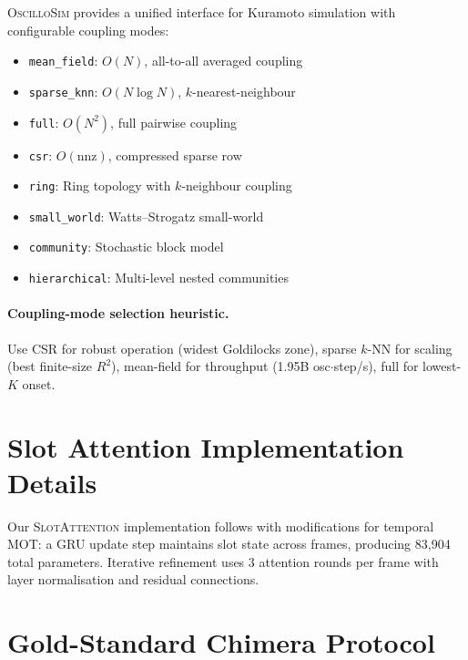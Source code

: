 \documentclass[11pt]{article}
\providecommand{\oscillosim}{\textnormal{\textsc{OscilloSim}}\xspace}
\providecommand{\sa}{\textnormal{\textsc{SlotAttention}}\xspace}
\begin{document}
\oscillosim provides a unified interface for Kuramoto simulation with
configurable coupling modes:
\begin{itemize}
  \item \texttt{mean\_field}: $O(N)$, all-to-all averaged coupling
  \item \texttt{sparse\_knn}: $O(N \log N)$, $k$-nearest-neighbour
  \item \texttt{full}: $O(N^2)$, full pairwise coupling
  \item \texttt{csr}: $O(\text{nnz})$, compressed sparse row
  \item \texttt{ring}: Ring topology with $k$-neighbour coupling
  \item \texttt{small\_world}: Watts--Strogatz small-world
  \item \texttt{community}: Stochastic block model
  \item \texttt{hierarchical}: Multi-level nested communities
\end{itemize}

\paragraph{Coupling-mode selection heuristic.}
Use CSR for robust operation (widest Goldilocks zone), sparse $k$-NN
for scaling (best finite-size $R^2$), mean-field for throughput
(1.95B osc$\cdot$step/s), full for lowest-$K$ onset.

\section{Slot Attention Implementation Details}
\label{app:slot_attention}

Our \sa implementation follows \citet{locatello2020object} with
modifications for temporal MOT: a GRU update step maintains slot
state across frames, producing 83{,}904 total parameters.  Iterative
refinement uses 3 attention rounds per frame with layer normalisation
and residual connections.

\section{Gold-Standard Chimera Protocol}
\label{app:chimera_protocol}
\end{document}
